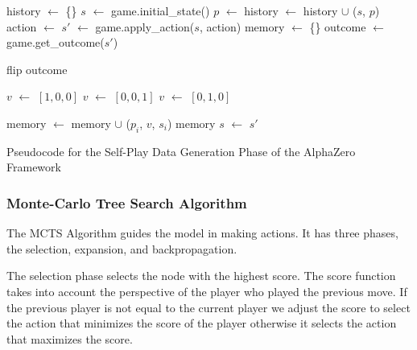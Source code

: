 \begin{algorithm}[htb]
    \begin{algorithmic}[1]
            \State history $\gets$ \{\}
            \State $s$ $\gets$ game.initial\_state()
            \Loop
                \State $p$ $\gets$ 
                \State history $\gets$ history $\cup$ ($s$, $p$)
                \State action $\gets$ 
                \State $s'$ $\gets$ game.apply\_action($s$, action)
                    \State memory $\gets$ \{\}
                        \State outcome $\gets$ game.get\_outcome($s'$)

                          \State flip outcome
                        \EndIf

                          \State $v$ $\gets$ $[1, 0, 0]$
                          \State $v$ $\gets$ $[0, 0, 1]$
                          \State $v$ $\gets$ $[0, 1, 0]$
                        \EndIf


                        \State memory $\gets$ memory $\cup$ ($p_i$, $v$, $s_i$)
                    \EndFor
                    \State \Return memory
                \EndIf
                \State $s$ $\gets$ $s'$
            \EndLoop
        \EndFunction
    \end{algorithmic}
    \caption{Pseudocode for the Self-Play Data Generation Phase of the AlphaZero Framework}
    \label{alg:data-generation}
\end{algorithm}

\subsubsection{Monte-Carlo Tree Search Algorithm}

The MCTS Algorithm guides the model in making actions. It has three phases, the selection, expansion, and backpropagation.

The selection phase selects the node with the highest score. The score function takes into account the perspective of the player who played the previous move. If the previous player is not equal to the current player we adjust the score to select the action that minimizes the score of the player otherwise it selects the action that maximizes the score. 

